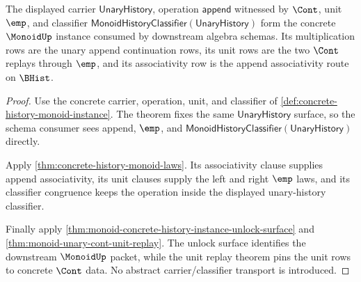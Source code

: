 \begin{theorem}
\label{thm:monoid-unary-cont-concrete-instance}
The displayed carrier $\mathsf{UnaryHistory}$, operation $\mathsf{append}$ witnessed by $\Cont$, unit $\emp$, and classifier $\mathsf{MonoidHistoryClassifier}(\mathsf{UnaryHistory})$ form the concrete $\MonoidUp$ instance consumed by downstream algebra schemas. Its multiplication rows are the unary append continuation rows, its unit rows are the two $\Cont$ replays through $\emp$, and its associativity row is the append associativity route on $\BHist$.
\end{theorem}
\begin{proof}
Use the concrete carrier, operation, unit, and classifier of \autoref{def:concrete-history-monoid-instance}. The theorem fixes the same $\mathsf{UnaryHistory}$ surface, so the schema consumer sees append, $\emp$, and $\mathsf{MonoidHistoryClassifier}(\mathsf{UnaryHistory})$ directly.

Apply \autoref{thm:concrete-history-monoid-laws}. Its associativity clause supplies append associativity, its unit clauses supply the left and right $\emp$ laws, and its classifier congruence keeps the operation inside the displayed unary-history classifier.

Finally apply \autoref{thm:monoid-concrete-history-instance-unlock-surface} and \autoref{thm:monoid-unary-cont-unit-replay}. The unlock surface identifies the downstream $\MonoidUp$ packet, while the unit replay theorem pins the unit rows to concrete $\Cont$ data. No abstract carrier/classifier transport is introduced.
\end{proof}

